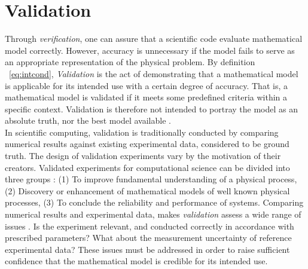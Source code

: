 \section{Validation}
Through \textit{verification}, one can assure that a scientific code evaluate mathematical model correctly. However, accuracy is unnecessary if the model fails to serve as an appropriate representation of the physical problem. By definition ~\ref{eq:intcond}, \textit{Validation} is the act of demonstrating that a mathematical model is applicable for its intended use with a certain degree of accuracy. That is, a mathematical model is validated if it meets some predefined criteria within a specific context. Validation is therefore not intended to portray the model as an absolute truth, nor the best model available \cite{Rykiel1996}. \\
In scientific computing, validation is traditionally conducted by comparing numerical results against existing experimental data, considered to be ground truth. The design of validation experiments vary by the motivation of their creators. Validated experiments for computational science can be divided into three groups \cite{Sommerville2006}: (1) To improve fundamental understanding of a physical process, (2) Discovery or enhancement of mathematical models of well known physical processes, (3) To conclude the reliability and performance of systems. Comparing numerical results and experimental data, makes \textit{validation} assess a wide range of issues \cite{Sommerville2006}. Is the experiment relevant, and  conducted correctly in accordance with prescribed parameters? What about the measurement uncertainty of reference experimental data? These issues  must be addressed in order to raise sufficient confidence that the mathematical model is credible for its intended use. \\
